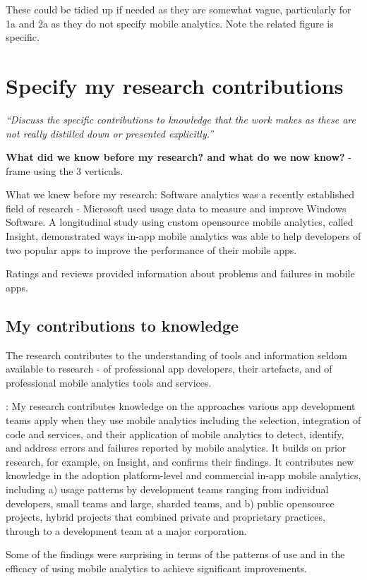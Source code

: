 These could be tidied up if needed as they are somewhat vague, particularly 
 for 1a and 2a as they do not specify mobile analytics. Note the related figure is specific.


\section{Specify my research contributions}
\emph{``Discuss the specific contributions to knowledge that the work makes as these are not really distilled down or presented explicitly.''}

\textbf{What did we know before my research? and what do we now know?} - frame using the 3 verticals.

What we knew before my research:
Software analytics was a recently established field of research - Microsoft used usage data to measure and improve Windows Software. A longitudinal study using custom opensource mobile analytics, called Insight, demonstrated ways in-app mobile analytics was able to help developers of two popular apps to improve the performance of their mobile apps.

Ratings and reviews provided information about problems and failures in mobile apps.

\subsection{My contributions to knowledge}
The research contributes to the understanding of tools and information seldom available to research - of professional app developers, their artefacts, and of professional mobile analytics tools and services. 

: 
My research contributes knowledge on the approaches various app development teams apply when they use mobile analytics including the selection, integration of code and services, and their application of mobile analytics to detect, identify, and address errors and failures reported by mobile analytics. It builds on prior research, for example, on Insight, and confirms their findings. It contributes new knowledge in the adoption platform-level and commercial in-app mobile analytics, including a) usage patterns by development teams ranging from individual  developers, small teams and large,  sharded teams, and b) public opensource projects, hybrid projects that combined private and proprietary practices, through to a development team at a major corporation.

Some of the findings were surprising in terms of the patterns of use and in the efficacy of using mobile analytics to achieve significant improvements.

